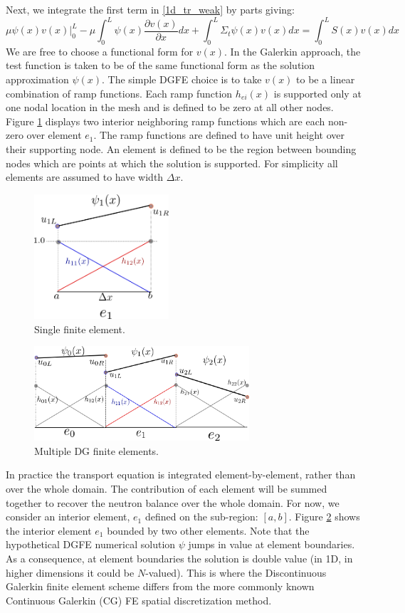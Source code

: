 Next, we integrate the first term in \ref{1d_tr_weak} by parts giving:
\begin{equation}
\mu \psi(x)v(x)|_0^L- \mu \int_0^L  \psi(x) \frac{\partial v(x)}{\partial x} dx + \int_0^L \Sigma_t \psi(x)v(x) dx =  \int_0^L S(x)v(x) dx
\label{1d_tr_weak2}
\end{equation}
We are free to choose a functional form for $v(x)$. In the Galerkin approach, the test function is
taken to be of the same functional form as the solution approximation $\psi(x)$. The simple DGFE choice is to take $v(x)$ to be a
linear combination of ramp functions. Each ramp function $h_{ei}(x)$ is supported only at one nodal location in the mesh
and is defined to be zero at all other nodes. Figure \ref{single_ele} displays two interior neighboring ramp functions which are each non-zero over element $e_1$. The ramp functions are defined to have unit height over their supporting node.  An element is defined to be the region between bounding nodes which are points at which the solution is supported.  For simplicity all elements are assumed to have width $\Delta x$.

\begin{figure}[!htbp]
\centering
\includegraphics[width=5cm]{images/single_ele.png}
\caption{Single finite element.}
\label{single_ele}
\end{figure}

\begin{figure}[!htbp]
\centering
\includegraphics[width=8cm]{images/multi_ele.png}
\caption{Multiple DG finite elements.}
\label{multi_ele}
\end{figure}

In practice the transport equation is integrated element-by-element, rather than over the whole domain.  The contribution of each element will be summed together to recover the neutron balance over the whole domain.  For now, we consider an interior element, $e_1$ defined on the sub-region: $[a, b]$.  Figure \ref{multi_ele} shows the interior element $e_1$ bounded by two other elements.  Note that the hypothetical DGFE numerical solution $\psi$ jumps in value at element boundaries.  As a consequence, at element boundaries the solution is double value (in 1D, in higher dimensions it could be $N$-valued).  This is where the Discontinuous Galerkin finite element scheme differs from the more commonly known Continuous Galerkin (CG) FE spatial discretization method.

